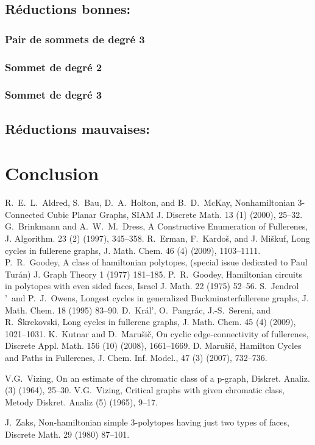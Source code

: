 \documentclass[10pt,a4paper]{article}
\begin{document}
\subsection{Réductions bonnes:}
\subsubsection{Pair de sommets de degré 3}
\subsubsection{Sommet de degré 2}
\subsubsection{Sommet de degré 3}
\subsection{Réductions mauvaises:}


\section{Conclusion}


\begin{thebibliography}{99}
 R.~E.~L.~Aldred, S.~Bau, D.~A.~Holton, and B.~D.~McKay,	
Nonhamiltonian 3-Connected Cubic Planar Graphs,
SIAM J. Discrete Math. 13 (1) (2000), 25--32.
 G.~Brinkmann and A.~W.~M.~Dress, A Constructive Enumeration of Fullerenes, J. Algorithm. 23 (2) (1997), 345--358.
 R.~Erman, F.~Kardo\v s, and J. Mi\v skuf, Long cycles in fullerene graphs, J. Math. Chem. 46 (4) (2009), 1103--1111.
 P.~R.~Goodey, A class of hamiltonian polytopes, (special issue dedicated to Paul Tur\'{a}n) J. Graph Theory 1 (1977) 181--185.
 P.~R.~Goodey, Hamiltonian circuits in polytopes with even sided faces, Israel J. Math. 22 (1975) 52--56.
 S.~Jendrol$\!$'~and P.~J.~Owens, {Longest cycles in generalized Buckminsterfullerene graphs}, J. Math. Chem. {18} (1995) 83--90.
 D.~Kr\'al$\!$', O.~Pangr\'ac, J.-S.~Sereni, and R.~\v Skrekovski, Long cycles in fullerene graphs, J. Math. Chem. 45 (4) (2009), 1021--1031.
 K.~Kutnar and D.~Maru\v si\v c, On cyclic edge-connectivity of fullerenes, Discrete Appl. Math. 156 (10) (2008), 1661--1669.
 D. Maru\v si\v c, {Hamilton Cycles and Paths in Fullerenes}, J. Chem. Inf. Model., {47} (3) (2007), 732--736. 

 V.G.~Vizing, On an estimate of the chromatic class of a p-graph, Diskret. Analiz. (3) (1964), 25--30.
 V.G.~Vizing, Critical graphs with given chromatic class, Metody Diskret. Analiz (5) (1965), 9--17.

 J.~Zaks, Non-hamiltonian simple 3-polytopes having just two types of faces, Discrete Math. 29 (1980) 87--101.

\end{thebibliography}
\end{document}
